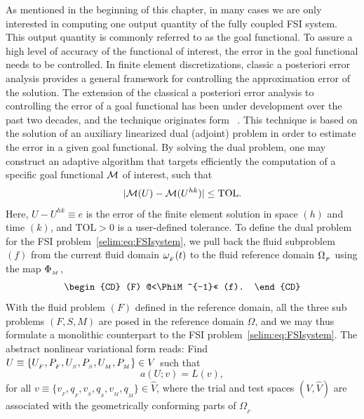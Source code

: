 As mentioned in the beginning of this chapter, in many cases we are
only interested in computing one output quantity of the fully coupled
FSI system. This output quantity is commonly referred to as the goal
functional.  To assure a high level of accuracy of the functional of
interest, the error in the goal functional needs to be controlled. In
finite element discretizations, classic a posteriori error analysis
provides a general framework for controlling the approximation error
of the solution.  The extension of the classical a posteriori error
analysis to controlling the error of a goal functional has been under
development over the past two decades, and the technique originates
form ~\cite{ErikssonEstepHansboEtAl1995, BeckerRannacher2001}. This
technique is based on the solution of an auxiliary linearized dual
(adjoint) problem in order to estimate the error in a given goal
functional. By solving the dual problem, one may construct an adaptive
algorithm that targets efficiently the computation of a specific goal
functional $\mathcal{M}$ of interest, such that
\begin{equation}
  \label{selim:eq:goalTOL}
|\mathcal{M}(U)-\mathcal{M}(U^{hk})| \leq \mathrm{TOL}.
\end{equation}
Here, $ U-U^{hk} \equiv e$ is the error of the finite element solution
in space $(h)$ and time $(k)$, and $\mathrm{TOL}>0$ is a user-defined
tolerance.  To define the dual problem for the FSI
problem~\eqref{selim:eq:FSIsystem}, we pull back the fluid subproblem
$(f)$ from the current fluid domain $\omega_{_{F}}(t)$ to the fluid reference
domain $\Omega_{_{F}}$ using the map $\Phi_{_{M}}$,
\begin{equation}
  \label{selim:eq:pullback}
  \begin{CD}
    (F) @<\PhiM^{-1}<< (f).
  \end{CD}
\end{equation}
With the fluid problem $(F)$ defined in the reference domain, all the
three sub problems $(F,S,M)$ are posed in the reference domain
$\Omega$, and we may thus formulate a monolithic counterpart to the
FSI problem~\eqref{selim:eq:FSIsystem}. The abstract nonlinear
variational form reads: Find $U\equiv \{ U_{_{F}}, P_{_{F}}, U_{_{S}}, P_{_{S}}, U_{_{M}},
P_{_{M}} \}\in V$ such that
\begin{equation}
\label{selim:eq:monolithic}
a(U;v) = L(v),
\end{equation}
for all $v\equiv \{ v_{_{F}}, q_{_{F}}, v_{_{S}}, q_{_{S}}, v_{_{M}}, q_{_{M}}
\}\in\hat{V}$, where the trial and test spaces $(V,\hat{V})$ are
associated with the geometrically conforming parts of $\Omega_{_{F}}$
